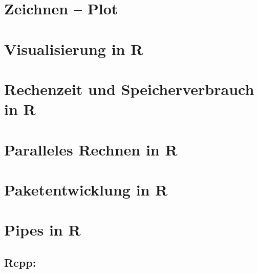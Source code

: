 \documentclass[10pt,twocolumn]{scrartcl}
\begin{document}
\section{Zeichnen -- Plot}

\section*{Visualisierung in R}

\section*{Rechenzeit und Speicherverbrauch in R}

\section*{Paralleles Rechnen in R}

\section*{Paketentwicklung in R}

\section*{Pipes in R}

\subsection*{Rcpp:}

\end{document}
